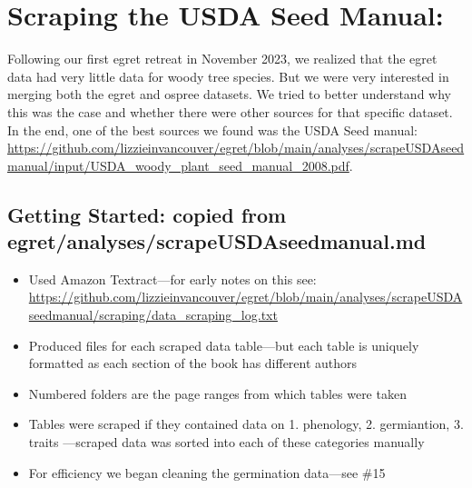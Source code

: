 \documentclass{article}[12pt]
\begin{document}
\section*{Scraping the USDA Seed Manual: }

Following our first egret retreat in November 2023, we realized that the egret data had very little data for woody tree species. But we were very interested in merging both the egret and ospree datasets. We tried to better understand why this was the case and whether there were other sources for that specific dataset. In the end, one of the best sources we found was the USDA Seed manual: \url{https://github.com/lizzieinvancouver/egret/blob/main/analyses/scrapeUSDAseedmanual/input/USDA_woody_plant_seed_manual_2008.pdf}.

\subsection*{Getting Started: copied from egret/analyses/scrapeUSDAseedmanual.md}
\begin{itemize}
\item Used Amazon Textract---for early notes on this see: \url{https://github.com/lizzieinvancouver/egret/blob/main/analyses/scrapeUSDAseedmanual/scraping/data_scraping_log.txt}
\item Produced files for each scraped data table---but each table is uniquely formatted as each section of the book has different authors
\item Numbered folders are the page ranges from which tables were taken
\item Tables were scraped if they contained data on 1. phenology, 2. germiantion, 3. traits ---scraped data was sorted into each of these categories manually
\item For efficiency we began cleaning the germination data---see \#15
\end{itemize}
\end{document}
